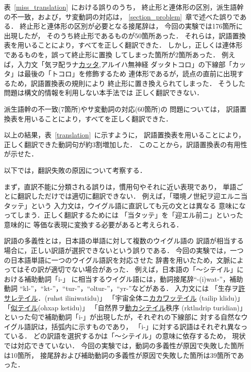 表~\ref{miss_translation}~における誤りのうち，
終止形と連体形の区別，派生語幹の不一致，および，サ変動詞の対応は，
\ref{section_problem}~章で述べた誤りである．
終止形と連体形の区別が必要となる接尾辞は，
今回の実験では176箇所に出現したが，
そのうち終止形であるものが50箇所あった．
それらは，訳語置換表を用いることにより，すべてを正しく翻訳できた．
しかし，正しくは連体形であるものを，誤って終止形に置換
してしまった箇所が2箇所あった．
例えば，入力文「気ヲ配ラナ\underline{カッタ},アルイハ無神経
ダッタトコロ」の下線部「カッタ」は最後の「トコロ」を修飾するため
連体形であるが，読点の直前に出現するため，訳語置換表の規則により
終止形に置き換えられてしまった．
そうした問題は構文的情報を利用しない本手法では
正しく翻訳できない．

派生語幹の不一致(7箇所)やサ変動詞の対応(60箇所)の
問題については，
訳語置換表を用いることにより，すべてを正しく翻訳できた．

以上の結果，表~\ref{translation}~に示すように，
訳語置換表を用いることにより，
正しく翻訳できた動詞句が約3割増加した．
このことから，訳語置換表の有用性が示せた．

以下では，翻訳失敗の原因について考察する．

まず，直訳不能に分類される誤りは，慣用句やそれに近い表現であり，
単語ごとに翻訳しただけでは適切に翻訳できない．
例えば，「環境ノ世紀ヲ迎エルニ当タッテ」という
入力文は，ウイグル語に直訳しても元の文とは異なる
意味になってしまう．正しく翻訳するためには
「当タッテ」を「迎エル前ニ」といった意味的に
等価な表現に変換する必要があると考えられる．

訳語の多義性とは，日本語の単語に対して複数のウイグル語の
訳語が相当する場合に，正しい訳語が選択できないという誤りである．
今回の実験では，一つの日本語単語に一つのウイグル語訳を対応させた
辞書を用いたため，文脈によってはその訳が適切でない場合があった．
例えば，日本語の「〜シテイル」における補助動詞「i-」
に相当するウイグル語には，動詞接尾辞``-(i)wat-''，補助動詞
``k\me l-''，``k\me t-''，``tur-''，``oltur-''，``y\mv r-''などがある．
入力文には
「生存ヲ\underline{許サレテイル}．(ruhs\me t \mk iliniwatidu)」
「宇宙全体ニ\underline{カカワッテイル}
(ta\mk ilip k\me lidu)」
「\underline{似テイル}(ohxap ketidu)」
「自然界ヲ\underline{動カシテイル}秩序
(\mh \me rk\me tl\me nd\mv rip turidi\mg an)」
といった句で補助動詞「i-」が出現したが，それぞれの下線部に
対する自然なウイグル語訳は，括弧内に示すものであり，
「i-」に対する訳語はそれぞれ異なっている．
どの訳語を選択するかは「〜シテイル」の意味に依存するため，
現状では対応できていない． 
今回の実験では，動詞の多義性が原因で失敗した箇所は10箇所，
接尾辞および補助動詞の多義性が原因で失敗した箇所は39箇所であった．

